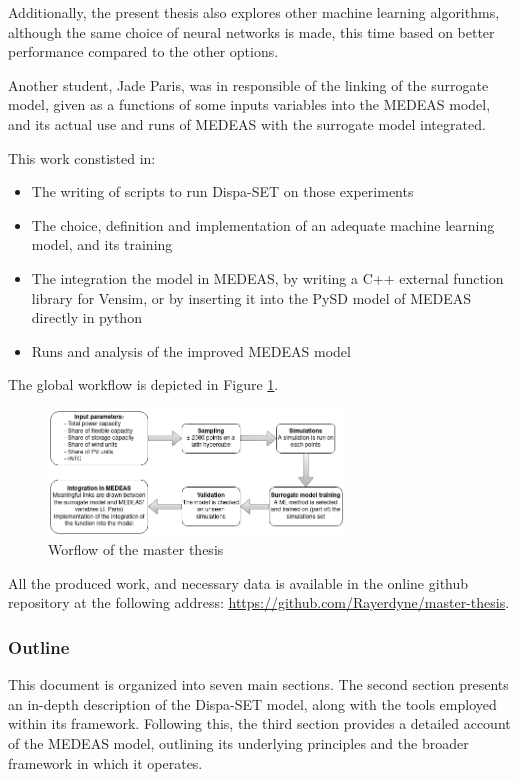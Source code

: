 Additionally, the present thesis also explores other machine learning algorithms, although the same choice of neural networks is made, this time based on better performance compared to the other options.

Another student, Jade Paris, was in responsible of the linking of the surrogate model, given as a functions of some inputs variables into the MEDEAS model, and its actual use and runs of MEDEAS with the surrogate model integrated.

This work constisted in:
\begin{itemize}
    \item The writing of scripts to run Dispa-SET on those experiments
    \item The choice, definition and implementation of an adequate machine learning model, and its training
    \item The integration the model in MEDEAS, by writing a C++ external function library for Vensim, or by inserting it into the PySD model of MEDEAS directly in python
    \item Runs and analysis of the improved MEDEAS model
\end{itemize}

The global workflow is depicted in Figure \ref{fig:thesis-workflow}.

\begin{figure}[h]
    \centering
    \includegraphics[width=0.7\textwidth]{resources/images/workflow.png}
    \caption{Worflow of the master thesis}
    \label{fig:thesis-workflow}
\end{figure}

All the produced work, and necessary data is available in the online github repository at the following address: \href{https://github.com/Rayerdyne/master-thesis}{https://github.com/Rayerdyne/master-thesis}.

\subsubsection{Outline}

This document is organized into seven main sections. The second section presents an in-depth description of the Dispa-SET model, along with the tools employed within its framework. Following this, the third section provides a detailed account of the MEDEAS model, outlining its underlying principles and the broader framework in which it operates.

